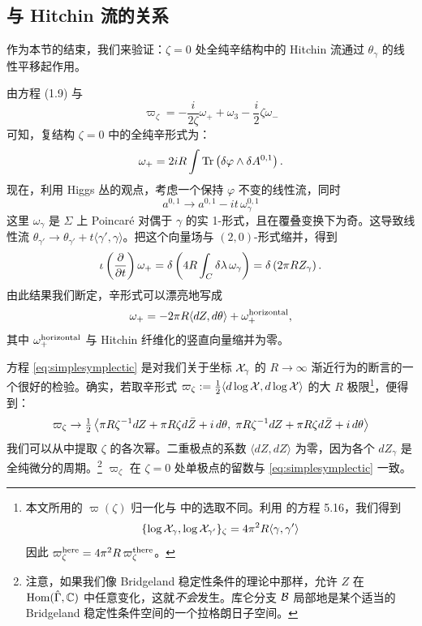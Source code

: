 \subsection{与 Hitchin 流的关系}

作为本节的结束，我们来验证：$\zeta=0$ 处全纯辛结构中的 Hitchin 流通过 $\theta_\gamma$ 的线性平移起作用。

由方程 (1.9) 与%
\begin{equation}
\varpi_\zeta = -\frac{i}{2\zeta}\omega_+ + \omega_3 - \frac{i}{2}\zeta\omega_-
\end{equation}
可知，复结构 $\zeta=0$ 中的全纯辛形式为：
\begin{equation}
\omega_+ = 2iR\int\operatorname{Tr}\left(\delta\varphi\wedge\delta A^{0,1}\right).
\end{equation}
现在，利用 Higgs 丛的观点，考虑一个保持 $\varphi$ 不变的线性流，同时
\begin{equation}
a^{0,1} \to a^{0,1} - it\,\omega_\gamma^{0,1}
\end{equation}
这里 $\omega_\gamma$ 是 $\Sigma$ 上 Poincaré 对偶于 $\gamma$ 的实 1-形式，且在覆叠变换下为奇。这导致线性流 $\theta_{\gamma'}\to\theta_{\gamma'}+t\langle\gamma',\gamma\rangle$。把这个向量场与 $(2,0)$-形式缩并，得到
\begin{equation}
\iota\left(\frac{\partial}{\partial t}\right)\omega_+ = \delta\left(4R\int_C\delta\lambda\,\omega_\gamma\right) = \delta\left(2\pi R Z_\gamma\right).
\end{equation}
由此结果我们断定，辛形式可以漂亮地写成
\begin{equation}\label{eq:simplesymplectic}
\omega_+ = -2\pi R\langle dZ,d\theta\rangle + \omega_+^{\rm horizontal},
\end{equation}
其中 $\omega_+^{\rm horizontal}$ 与 Hitchin 纤维化的竖直向量缩并为零。

方程 \eqref{eq:simplesymplectic} 是对我们关于坐标 $\mathcal{X}_\gamma$ 的 $R\to\infty$ 渐近行为的断言的一个很好的检验。确实，若取辛形式 $\varpi_\zeta:=\tfrac{1}{2}\langle d\log\mathcal{X},d\log\mathcal{X}\rangle$ 的大 $R$ 极限\footnote{本文所用的 $\varpi(\zeta)$ 归一化与 \cite{Gaiotto:2008cd} 中的选取不同。利用 \cite{Gaiotto:2008cd} 的方程 5.16，我们得到
\begin{equation}
\{\log\mathcal{X}_\gamma,\log\mathcal{X}_{\gamma'}\}_\zeta = 4\pi^2R\langle\gamma,\gamma'\rangle
\end{equation}
因此 $\varpi_\zeta^{\rm here} = 4\pi^2R\,\varpi_\zeta^{\rm there}$。}，便得到：
\begin{equation}\label{eq:RtoInfty3}
\varpi_\zeta \to \tfrac{1}{2}\left\langle \pi R\zeta^{-1}dZ + \pi R\zeta d\bar Z + i\,d\theta,\; \pi R\zeta^{-1}dZ + \pi R\zeta d\bar Z + i\,d\theta\right\rangle
\end{equation}
我们可以从中提取 $\zeta$ 的各次幂。二重极点的系数 $\langle dZ,dZ\rangle$ 为零，因为各个 $dZ_\gamma$ 是全纯微分的周期。\footnote{注意，如果我们像 Bridgeland 稳定性条件的理论中那样，允许 $Z$ 在 $\operatorname{Hom}(\hat\Gamma,\mathbb{C})$ 中任意变化，这就\emph{不会}发生。库仑分支 $\mathcal{B}$ 局部地是某个适当的 Bridgeland 稳定性条件空间的一个拉格朗日子空间。} $\varpi_\zeta$ 在 $\zeta=0$ 处单极点的留数与 \eqref{eq:simplesymplectic} 一致。

